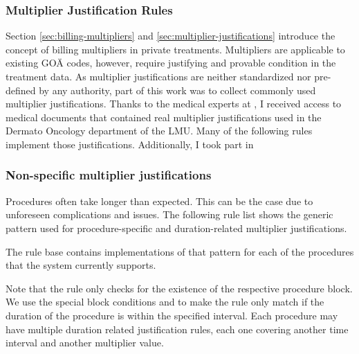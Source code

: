 \subsubsection{Multiplier Justification Rules}\label{subsubsec:multiplier-justification-rules}
Section \ref{sec:billing-multipliers} and \ref{sec:multiplier-justifications} introduce the concept of billing multipliers in private treatments.
Multipliers are applicable to existing GOÄ codes, however, require justifying and provable condition in the treatment data.
As multiplier justifications are neither standardized nor pre-defined by any authority,
part of this work was to collect commonly used multiplier justifications.
Thanks to the medical experts at \AV, I received access to medical documents that contained real multiplier justifications used in the Dermato Oncology department of the LMU.
Many of the following rules implement those justifications.
Additionally, I took part in 


\subsubsection{Non-specific multiplier justifications}



Procedures often take longer than expected.
This can be the case due to unforeseen complications and issues.
The following rule list shows the generic pattern used for procedure-specific and duration-related multiplier justifications.



The rule base contains implementations of that pattern for each of the procedures that the system currently supports.

Note that the rule only checks for the existence of the respective procedure block.
We use the special block conditions  and  to make the rule only match if the duration of the procedure is within the specified interval.
Each procedure may have multiple duration related justification rules, each one covering another time interval and another multiplier value.




